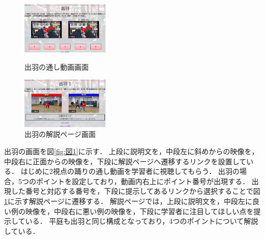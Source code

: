 \documentclass[twocolumn,10pt,a4j]{ltjsarticle}
\begin{document}
\begin{figure}[htbp]
 \begin{minipage}{0.5\hsize}
  \centering
  \includegraphics[width=42mm]{figures/zu11.png}
  \caption{出羽の通し動画画面}
   \label{fig:図1}
 \end{minipage}
 \begin{minipage}{0.5\hsize}
  \centering
  \includegraphics[width=42mm]{figures/zu12.png}
  \caption{出羽の解説ページ画面}
   \label{fig:図2}
 \end{minipage}
\end{figure}

出羽の画面を図\ref{fig:図1}に示す．
上段に説明文を，中段左に斜めからの映像を，中段右に正面からの映像を，下段に解説ページへ遷移するリンクを設置している．
はじめに2視点の踊りの通し動画を学習者に視聴してもらう．
出羽の場合，5つのポイントを設定しており，動画内右上にポイント番号が出現する．
出現した番号と対応する番号を，下段に提示してあるリンクから選択することで図\ref{fig:図2}に示す解説ページに遷移する．
解説ページでは，上段に説明文を，中段左に良い例の映像を，中段右に悪い例の映像を，下段に学習者に注目してほしい点を提示している．
平庭も出羽と同じ構成となっており，4つのポイントについて解説している．
\end{document}
